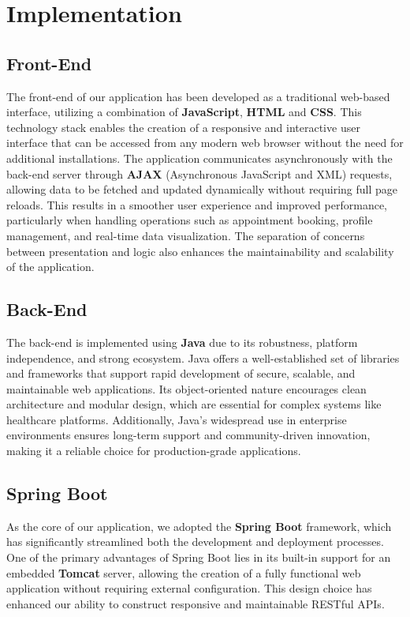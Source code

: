 \chapter{Implementation}
\section{Front-End}
The front-end of our application has been developed as a traditional web-based interface, utilizing a combination of \textbf{JavaScript}, \textbf{HTML} and \textbf{CSS}. This technology stack enables the creation of a responsive and interactive user interface that can be accessed from any modern web browser without the need for additional installations. The application communicates asynchronously with the back-end server through \textbf{AJAX} (Asynchronous JavaScript and XML) requests, allowing data to be fetched and updated dynamically without requiring full page reloads. This results in a smoother user experience and improved performance, particularly when handling operations such as appointment booking, profile management, and real-time data visualization. The separation of concerns between presentation and logic also enhances the maintainability and scalability of the application.

\section{Back-End}
The back-end is implemented using \textbf{Java} due to its robustness, platform independence, and strong ecosystem. Java offers a well-established set of libraries and frameworks that support rapid development of secure, scalable, and maintainable web applications. Its object-oriented nature encourages clean architecture and modular design, which are essential for complex systems like healthcare platforms. Additionally, Java's widespread use in enterprise environments ensures long-term support and community-driven innovation, making it a reliable choice for production-grade applications.

\section{Spring Boot}
As the core of our application, we adopted the \textbf{Spring Boot} framework, which has significantly streamlined both the development and deployment processes. One of the primary advantages of Spring Boot lies in its built-in support for an embedded \textbf{Tomcat} server, allowing the creation of a fully functional web application without requiring external configuration. This design choice has enhanced our ability to construct responsive and maintainable RESTful APIs. 


